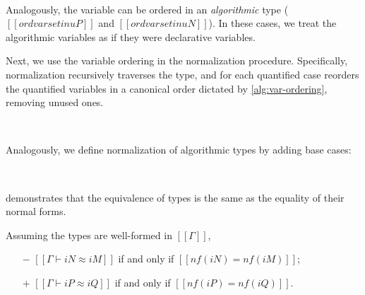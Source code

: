 \documentclass[a4,natbib=false]{article}
\begin{document}
\begin{algorithm}
  \label{alg:var-ordering}
  \hfill
  
  \begin{multicols}{2}
  \ottdefnONVar{}
  \columnbreak\\
  \ottdefnOPVar{}
  \end{multicols}

  Analogously, the variable can be ordered in 
  an \emph{algorithmic} type ($[[ord varset in uP]]$ and 
  $[[ord varset in uN]]$). In these cases, we treat the algorithmic variables
  as if they were declarative variables.

\end{algorithm}

Next, we use the variable ordering in the normalization procedure. 
Specifically, normalization recursively traverses the type, 
and for each quantified case reorders the quantified variables in a 
canonical order dictated by \cref{alg:var-ordering}, removing unused ones.

\begin{algorithm}
  \label{alg:type-nf}
  \hfill
  
  \begin{multicols}{2}
  \ottdefnNrmNNorm{}
  \columnbreak\\
  \ottdefnNrmPNorm{}
  \end{multicols}

  Analogously,  we define normalization of algorithmic types 
  by adding base cases:

  \begin{multicols}{2}
  \ottdefnNrmuNNorm{}
  \columnbreak\\
  \ottdefnNrmuPNorm{}
  \end{multicols}

\end{algorithm}

demonstrates that the equivalence of types is the same
as the equality of their normal forms.
\begin{theorempreview}
  Assuming the types are well-formed in $[[Γ]]$, 
  \begin{itemize}
    \item [$-$] $[[Γ ⊢ iN ≈ iM]]$ if and only if $[[nf(iN) = nf(iM)]]$;
    \item [$+$] $[[Γ ⊢ iP ≈ iQ]]$ if and only if $[[nf(iP) = nf(iQ)]]$.
  \end{itemize}
\end{theorempreview}
\end{document}
